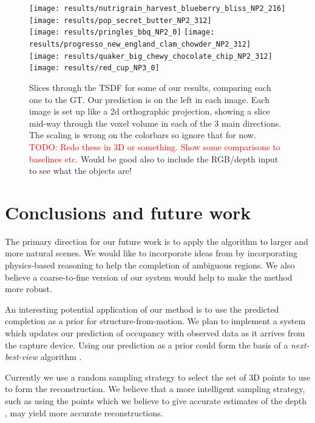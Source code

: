 \documentclass[10pt,twocolumn,letterpaper]{article}
\newcommand{\todo}[1]{\textcolor{red}{TODO: #1}}
\begin{document}
\newcommand{\resultswidth}{0.41\columnwidth}
\begin{figure}
     \texttt{[image: results/nutrigrain\_harvest\_blueberry\_bliss\_NP2\_216]}
     \texttt{[image: results/pop\_secret\_butter\_NP2\_312]}\\
     \texttt{[image: results/pringles\_bbq\_NP2\_0]}
     \texttt{[image: results/progresso\_new\_england\_clam\_chowder\_NP2\_312]}\\
     \texttt{[image: results/quaker\_big\_chewy\_chocolate\_chip\_NP2\_312]}
     \texttt{[image: results/red\_cup\_NP3\_0]}
     \caption{Slices through the TSDF for some of our results, comparing each one to the GT. 
     Our prediction is on the left in each image.
     Each image is set up like a 2d orthographic projection, showing a slice mid-way through the voxel volume in each of the 3 main directions.
     The scaling is wrong on the colorbars so ignore that for now.
     \todo{Redo these in 3D or something. Show some comparisons to baselines etc.}
     Would be good also to include the RGB/depth input to see what the objects are!}
\end{figure}


\section{Conclusions and future work}


The primary direction for our future work is to apply the algorithm to larger and more natural scenes.
We would like to incorporate ideas from \cite{zheng-cvpr-2013, shao-siggraphasia-2014} by incorporating physics-based reasoning to help the completion of ambiguous regions.
We also believe a coarse-to-fine version of our system would help to make the method more robust.

An interesting potential application of our method is to use the predicted completion as a prior for structure-from-motion.
We plan to implement a system which updates our prediction of occupancy with observed data as it arrives from the capture device.
Using our prediction as a prior could form the basis of a \emph{next-best-view} algorithm \cite{Potthast2014148}.

Currently we use a random sampling strategy to select the set of 3D points to use to form the reconstruction.
We believe that a more intelligent sampling strategy, such as using the points which we believe to give accurate estimates of the depth \cite{reynolds-cvpr-2011}, may yield more accurate reconstructions.
\end{document}
